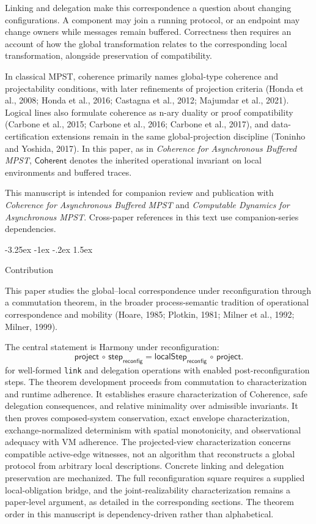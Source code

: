 \documentclass[a4paper,10pt,twocolumn,english]{article}
\makeatletter
\renewcommand{\subsection}{\@startsection{subsection}{2}{\z@}%
  {-3.25ex \@plus -1ex \@minus -.2ex}%
  {1.5ex}%
  {\raggedright\normalfont\normalsize\bfseries}}
\numberwithin{equation}{section}
\theoremstyle{paperdef}
\theoremstyle{paperplain}
\theoremstyle{paperdef}
\theoremstyle{paperremark}
\theoremstyle{paperdef}
\newcommand{\Coherent}{\ensuremath{\mathsf{Coherent}}}
\makeatother
\begin{document}
Linking and delegation make this correspondence a question about changing configurations.
A component may join a running protocol, or an endpoint may change owners while messages remain
buffered. Correctness then requires an account of how the global transformation relates to the
corresponding local transformation, alongside preservation of compatibility.

In classical MPST, coherence primarily names global-type coherence and projectability
conditions, with later refinements of projection criteria (Honda et al., 2008; Honda et al., 2016;
Castagna et al., 2012; Majumdar et al., 2021). Logical lines also formulate
coherence as n-ary duality or proof compatibility (Carbone et al., 2015; Carbone et al., 2016; Carbone
et al., 2017), and data-certification extensions remain in the same global-projection discipline
(Toninho and Yoshida, 2017). In this paper, as in \emph{Coherence for Asynchronous Buffered MPST}, $\Coherent$ denotes
the inherited operational invariant on local environments and buffered traces.

This manuscript is intended for companion review and publication with
\emph{Coherence for Asynchronous Buffered MPST} and
\emph{Computable Dynamics for Asynchronous MPST}. Cross-paper references in this
text use companion-series dependencies.

\subsection{Contribution}

This paper studies the global--local correspondence under reconfiguration through a commutation theorem, in the broader process-semantic tradition of operational correspondence and mobility (Hoare, 1985; Plotkin, 1981; Milner et al., 1992; Milner, 1999).

The central statement is Harmony under reconfiguration:
\begin{equation}
	\mathsf{project}\,\circ\,\mathsf{step}_{\mathsf{reconfig}}
	=
	\mathsf{localStep}_{\mathsf{reconfig}}\,\circ\,\mathsf{project}.
\end{equation}
for well-formed \texttt{link} and delegation operations with enabled post-reconfiguration steps. The
theorem development proceeds from commutation to characterization and runtime adherence. It
establishes erasure characterization of Coherence, safe delegation consequences, and relative minimality
over admissible invariants. It then proves composed-system conservation, exact envelope
characterization, exchange-normalized determinism with spatial monotonicity, and observational adequacy
with VM adherence.
The projected-view characterization concerns compatible active-edge witnesses, not an algorithm
that reconstructs a global protocol from arbitrary local descriptions. Concrete linking and delegation
preservation are mechanized. The full reconfiguration square requires a supplied local-obligation
bridge, and the joint-realizability characterization remains a paper-level argument, as detailed
in the corresponding sections.
The theorem order in this manuscript is dependency-driven rather than alphabetical.
\end{document}
